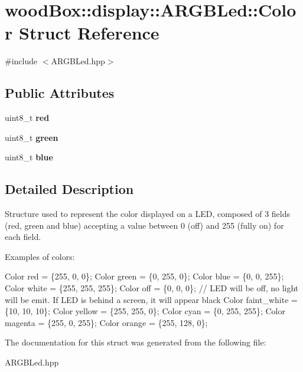 \hypertarget{structwood_box_1_1display_1_1_a_r_g_b_led_1_1_color}{}\section{wood\+Box\+:\+:display\+:\+:A\+R\+G\+B\+Led\+:\+:Color Struct Reference}
\label{structwood_box_1_1display_1_1_a_r_g_b_led_1_1_color}


{\ttfamily \#include $<$A\+R\+G\+B\+Led.\+hpp$>$}

\subsection*{Public Attributes}
\begin{DoxyCompactItemize}
\item 
\mbox{\label{structwood_box_1_1display_1_1_a_r_g_b_led_1_1_color_a72c1bf60c1ed082f9abaf44fb0b585cd}} 
uint8\+\_\+t {\bfseries red}
\item 
\mbox{\label{structwood_box_1_1display_1_1_a_r_g_b_led_1_1_color_a282da85a3c4f9795186f0bb2c4ca2073}} 
uint8\+\_\+t {\bfseries green}
\item 
\mbox{\label{structwood_box_1_1display_1_1_a_r_g_b_led_1_1_color_a61eeae5c5896ee5ea3db56d5c124ee1a}} 
uint8\+\_\+t {\bfseries blue}
\end{DoxyCompactItemize}


\subsection{Detailed Description}
Structure used to represent the color displayed on a L\+ED, composed of 3 fields (red, green and blue) accepting a value between 0 (off) and 255 (fully on) for each field.

Examples of colors\+:


\begin{DoxyCode}
Color red = \{255, 0, 0\};
Color green = \{0, 255, 0\};
Color blue = \{0, 0, 255\};
Color white = \{255, 255, 255\};
Color off = \{0, 0, 0\}; \textcolor{comment}{// LED will be off, no light will be emit. If LED is behind a screen, it will appear
       black}
Color faint\_white = \{10, 10, 10\};
Color yellow = \{255, 255, 0\};
Color cyan = \{0, 255, 255\};
Color magenta = \{255, 0, 255\};
Color orange = \{255, 128, 0\};
\end{DoxyCode}
 

The documentation for this struct was generated from the following file\+:\begin{DoxyCompactItemize}
\item 
A\+R\+G\+B\+Led.\+hpp\end{DoxyCompactItemize}
